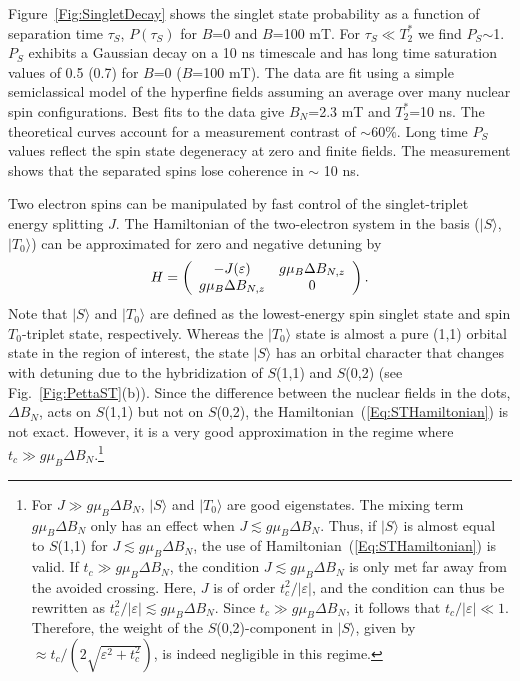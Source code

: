 \documentclass[rmp,twocolumn,aps]{revtex4}
\begin{document}
Figure~\ref{Fig:SingletDecay} shows the singlet state probability
as a function of separation time $\tau_S$, $P(\tau_S)$ for $B$=0
and $B$=100 mT. For $\tau_S$$\ll$$T_2^*$ we find $P_S$$\sim$1.
$P_S$ exhibits a Gaussian decay on a 10 ns timescale and has long
time saturation values of 0.5 (0.7) for $B$=0 ($B$=100 mT). The
data are fit using a simple semiclassical model of the hyperfine
fields assuming an average over many nuclear spin configurations.
Best fits to the data give $B_{N}$=2.3 mT and $T_2^*$=10 ns. The
theoretical curves account for a measurement contrast of
$\sim$60$\%$. Long time $P_S$ values reflect the spin state
degeneracy at zero and finite fields. The measurement shows that
the separated spins lose coherence in $\sim$ 10 ns.

Two electron spins can be manipulated by fast control of the singlet-triplet energy splitting $J$. The Hamiltonian of the two-electron system in the basis ($|S \rangle$, $|T_0 \rangle$) can be approximated for zero and negative detuning by
\begin{equation}
H= \left(\begin{array}{c c}
-J(\varepsilon) & g \mu_B \Delta B_{N,z}\\
g \mu_B \Delta B_{N,z} & 0 \end{array}\right).
	\label{Eq:STHamiltonian}
\end{equation}
Note that $|S \rangle$ and $|T_0 \rangle$ are defined as the lowest-energy spin singlet state and spin $T_0$-triplet state, respectively. Whereas the $|T_0 \rangle$ state is almost a pure (1,1) orbital state in the region of interest, the state $|S \rangle$ has an orbital character that changes with detuning due to the hybridization of $S$(1,1) and $S$(0,2) (see Fig.~\ref{Fig:PettaST}(b)). Since the difference between the nuclear fields in the dots, $\Delta B_{N}$, acts on $S$(1,1) but not on $S$(0,2), the Hamiltonian~(\ref{Eq:STHamiltonian}) is not exact. However, it is a very good approximation in the regime where $t_c \gg g \mu_B \Delta B_{N}$.\footnote{For $J \gg g \mu_B \Delta B_{N}$, $|S \rangle$ and $|T_0 \rangle$ are good eigenstates. The mixing term $g \mu_B \Delta B_{N}$ only has an effect when $J \lesssim g \mu_B \Delta B_{N}$. Thus, if $|S \rangle$ is almost equal to $S$(1,1) for $J \lesssim g \mu_B \Delta B_{N}$, the use of Hamiltonian~(\ref{Eq:STHamiltonian}) is valid. If $t_c \gg g \mu_B \Delta B_{N}$, the condition $J \lesssim g \mu_B \Delta B_{N}$ is only met far away from the avoided crossing. Here, $J$ is of order $t^2_c/\left| \varepsilon \right|$, and the condition can thus be rewritten as $t^2_c/\left| \varepsilon \right| \lesssim g \mu_B \Delta B_{N}$. Since $t_c \gg g \mu_B \Delta B_{N}$, it follows that $t_c/\left| \varepsilon \right| \ll 1$. Therefore, the weight of the $S$(0,2)-component in $|S \rangle$, given by $\approx t_c/(2\sqrt{\varepsilon^2 + t^2_c})$, is indeed negligible in this regime.}
\end{document}
